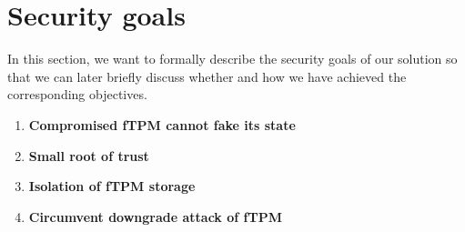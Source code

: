 \section{Security goals}

In this section, we want to formally describe the security goals of our solution so that we can later briefly discuss whether and how we have achieved the corresponding objectives.

\begin{enumerate}

  \item{\textbf{Compromised fTPM cannot fake its state}}
  \item{\textbf{Small root of trust}}
  

  \item{\textbf{Isolation of fTPM storage}}
  
  \item{\textbf{Circumvent downgrade attack of fTPM}}
  




\end{enumerate}
